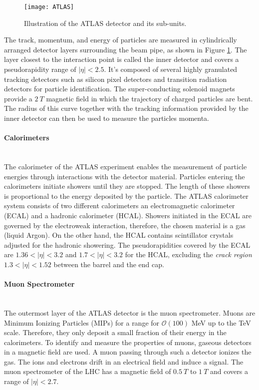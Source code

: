 \begin{figure}[H]
\centering
\texttt{[image: ATLAS]}
\caption{Illustration of the ATLAS detector and its sub-units.\cite{ATLASP}}
\label{fig:ATLAS}
\end{figure}

The track, momentum, and energy of particles are measured in cylindrically arranged detector layers surrounding the beam pipe, as shown in Figure \ref{fig:ATLAS}. The layer closest to the interaction point is called the inner detector and covers a pseudorapidity range of $|\eta| < 2.5$. It's composed of several highly granulated tracking detectors such as silicon pixel detectors and transition radiation detectors for particle identification. The super-conducting solenoid magnets provide a $\SI{2}{T}$ magnetic field in which the trajectory of charged particles are bent. The radius of this curve together with the tracking information provided by the inner detector can then be used to measure the particles momenta. 

\paragraph{Calorimeters} \mbox{} \\
The calorimeter of the ATLAS experiment enables the measurement of particle energies through interactions with the detector material. Particles entering the calorimeters initiate showers until they are stopped. The length of these showers is proportional to the energy deposited by the particle. The ATLAS calorimeter system consists of two different calorimeters an electromagnetic calorimeter (ECAL) and a hadronic calorimeter (HCAL). Showers initiated in the ECAL are governed by the electroweak interaction, therefore, the chosen material is a gas (liquid  Argon). On the other hand, the HCAL contains scintillator crystals adjusted for the hadronic showering. The pseudorapidities covered by the ECAL are $1.36 < |\eta| < 3.2$ and $1.7 < |\eta| < 3.2$ for the HCAL, excluding the \textit{crack region} $1.3 < |\eta| < 1.52$ between the barrel and the end cap.

\paragraph{Muon Spectrometer} \mbox{} \\
The outermost layer of the ATLAS detector is the muon spectrometer. Muons are Minimum Ionizing Particles (MIPs) for a range for $\mathcal{O}(100)$ MeV up to the TeV scale. Therefore, they only deposit a small fraction of their energy in the calorimeters. To identify and measure the properties of muons, gaseous detectors in a magnetic field are used. A muon passing through such a detector ionizes the gas. The ions and electrons drift in an electrical field and induce a signal. The muon spectrometer of the LHC has a magnetic field of $\SI{0.5}{T}$ to $\SI{1}{T}$ and covers a range of $|\eta| < 2.7$.


